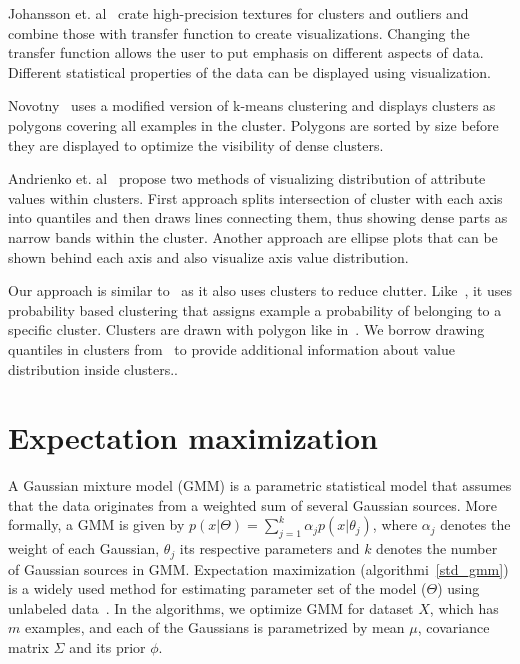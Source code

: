 \documentclass[10pt,a4paper]{article}
\begin{document}
Johansson et. al~\cite{JLJC05} crate high-precision textures for clusters and outliers and combine those with transfer function to create visualizations. Changing the transfer function allows the user to put emphasis on different aspects of data. Different statistical properties of the data can be displayed using visualization.

Novotny~\cite{N04} uses a modified version of k-means clustering and displays clusters as polygons covering all examples in the cluster. Polygons are sorted by size before they are displayed to optimize the visibility of dense clusters.

Andrienko et. al~\cite{AA04} propose two methods of visualizing distribution of attribute values within clusters. First approach splits intersection of cluster with each axis into quantiles and then draws lines connecting them, thus showing dense parts as narrow bands within the cluster. Another approach are ellipse plots that can be shown behind each axis and also visualize axis value distribution.

Our approach is similar to~\cite{FWR99b,JLJC05,N04} as it also uses clusters to reduce clutter. Like~\cite{BH03}, it uses probability based clustering that assigns example a probability of belonging to a specific cluster. Clusters are drawn with polygon like in~\cite{N04,AA04}. We borrow drawing quantiles in clusters from~\cite{AA04} to provide additional information about value distribution inside clusters.. 

\section{Expectation maximization}
A Gaussian mixture model (GMM) is a parametric statistical model that assumes that the data originates from a weighted sum of several Gaussian sources. More formally, a GMM is given by
$p(x|\Theta) = \sum^k_{j=1}\alpha_jp(x|\theta_j)$, where $\alpha_j$ denotes the weight of each Gaussian, $\theta_j$ its respective parameters and  $k$ denotes the number of Gaussian sources in GMM. Expectation maximization (algorithmi~\ref{std_gmm}) is a widely used method for estimating parameter set of the model ($\Theta$) using unlabeled data~\cite{DLR77}. In the algorithms, we optimize GMM for dataset $X$, which has $m$ examples, and each of the Gaussians is parametrized by mean $\mu$, covariance matrix $\Sigma$ and its prior $\phi$. 
\end{document}
